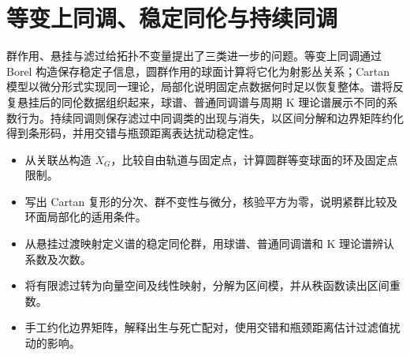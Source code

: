 
% 
% 
% 
% 
% 
% 
% 

\chapter{等变上同调、稳定同伦与持续同调}
\label{g2:app:C}

\begin{chapterabstract}
	群作用、悬挂与滤过给拓扑不变量提出了三类进一步的问题。等变上同调通过 Borel 构造保存稳定子信息，圆群作用的球面计算将它化为射影丛关系；Cartan 模型以微分形式实现同一理论，局部化说明固定点数据何时足以恢复整体。谱将反复悬挂后的同伦数据组织起来，球谱、普通同调谱与周期 K 理论谱展示不同的系数行为。持续同调则保存滤过中同调类的出现与消失，以区间分解和边界矩阵约化得到条形码，并用交错与瓶颈距离表达扰动稳定性。
\end{chapterabstract}

\begin{learninggoals}
	\begin{itemize}
		\item 从关联丛构造 \(X_G\)，比较自由轨道与固定点，计算圆群等变球面的环及固定点限制。
		\item 写出 Cartan 复形的分次、群不变性与微分，核验平方为零，说明紧群比较及环面局部化的适用条件。
		\item 从悬挂过渡映射定义谱的稳定同伦群，用球谱、普通同调谱和 K 理论谱辨认系数及次数。
		\item 将有限滤过转为向量空间及线性映射，分解为区间模，并从秩函数读出区间重数。
		\item 手工约化边界矩阵，解释出生与死亡配对，使用交错和瓶颈距离估计过滤值扰动的影响。
	\end{itemize}
\end{learninggoals}

